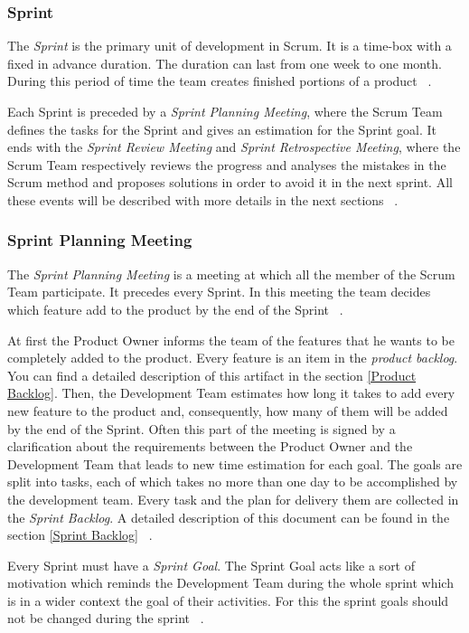 			
			\subsubsection{Sprint}
			The \emph{Sprint} is the primary unit of development in Scrum. It is a time-box with a fixed in advance duration. The duration can last from one week to one month. During this period of time the team creates finished portions of a product ~\cite{scrumEnglishGuide}. 
	
			Each Sprint is preceded by a \emph{Sprint Planning Meeting}, where the Scrum Team defines the tasks for the Sprint and gives an estimation for the Sprint goal. It ends with the \emph{Sprint Review Meeting} and \emph{Sprint Retrospective Meeting}, where the Scrum Team respectively reviews the progress and analyses the mistakes in the Scrum method and proposes solutions in order to avoid it in the next sprint. All these events will be described with more details in the next sections ~\cite{scrumEnglishGuide}.  


			\subsubsection{Sprint Planning Meeting}
			The \emph{Sprint Planning Meeting} is a meeting at which all the member of the Scrum Team participate. It precedes every Sprint. In this meeting the team decides which feature add to the product by the end of the Sprint ~\cite{scrumEnglishGuide}.

			At first the Product Owner informs the team of the features that he wants to be completely added to the product. Every feature is an item in the \emph{product backlog}. You can find a detailed description of this artifact in the section \ref{Product Backlog}. Then, the Development Team estimates how long it takes to add every new feature to the product and, consequently, how many of them will be added by the end of the Sprint. Often this part of the meeting is signed by a clarification about the requirements between the Product Owner and the Development Team that leads to new time estimation for each goal. The goals are split into tasks, each of which takes no more than one day to be accomplished by the development team. Every task and the plan for delivery them are collected in the \emph{Sprint Backlog}. A detailed description of this document can be found in the section \ref{Sprint Backlog} ~\cite{scrumEnglishGuide}.

			Every Sprint must have a \emph{Sprint Goal}. The Sprint Goal acts like a sort of motivation which reminds the Development Team during the whole sprint which is in a wider context the goal of their activities. For this the sprint goals should not be changed during the sprint ~\cite{scrumEnglishGuide}.
		
